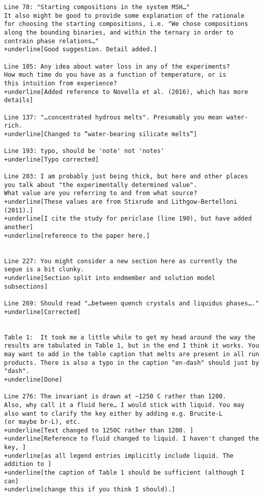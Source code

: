 \documentclass[10pt]{letter}
\begin{document}
\begin{letter}{}
\begin{Verbatim}[commandchars=+\[\]]
Line 78: "Starting compositions in the system MSH…"  
It also might be good to provide some explanation of the rationale 
for choosing the starting compositions, i.e. "We chose compositions 
along the bounding binaries, and within the ternary in order to 
contrain phase relations…"
+underline[Good suggestion. Detail added.]

Line 105: Any idea about water loss in any of the experiments? 
How much time do you have as a function of temperature, or is 
this intuition from experience?
+underline[Added reference to Novella et al. (2016), which has more details]

Line 137: "…concentrated hydrous melts". Presumably you mean water-rich.
+underline[Changed to “water-bearing silicate melts”]

Line 193: typo, should be 'note' not 'notes'
+underline[Typo corrected]

Line 203: I am probably just being thick, but here and other places 
you talk about "the experimentally determined value". 
What value are you referring to and from what source?
+underline[These values are from Stixrude and Lithgow-Bertelloni (2011).]
+underline[I cite the study for periclase (line 190), but have added another]
+underline[reference to the paper here.]

 
Line 227: You might consider a new section here as currently the 
segue is a bit clunky.
+underline[Section split into endmember and solution model subsections]

Line 269: Should read "…between quench crystals and liquidus phases…."
+underline[Corrected]


Table 1:  It took me a little while to get my head around the way the 
results are tabulated in Table 1, but in the end I think it works. You 
may want to add in the table caption that melts are present in all run 
products. There is also a typo in the caption "en-dash" should just by 
"dash".
+underline[Done]

Line 276: The invariant is drawn at ~1250 C rather than 1200. 
Also, why call it a fluid here… I would stick with liquid. You may
also want to clarify the key either by adding e.g. Brucite-L 
(or maybe br-L), etc.
+underline[Text changed to 1250C rather than 1200. ]
+underline[Reference to fluid changed to liquid. I haven't changed the key, ]
+underline[as all legend entries implicitly include liquid. The addition to ]
+underline[the caption of Table 1 should be sufficient (although I can]
+underline[change this if you think I should).]


\end{Verbatim}
\end{letter}
\end{document}
